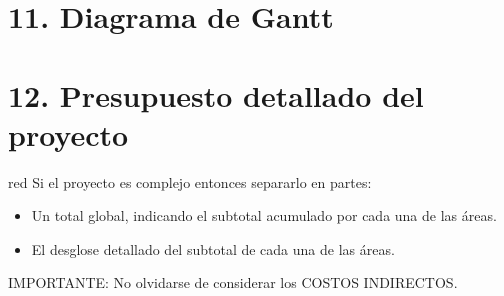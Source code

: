 \documentclass[11pt, %
codirector, %
]{charter}
\begin{document}
\section{11. Diagrama de Gantt}
\label{sec:gantt}





\section{12. Presupuesto detallado del proyecto}
\label{sec:presupuesto}

\begin{consigna}{red}
Si el proyecto es complejo entonces separarlo en partes:
\begin{itemize}
	\item Un total global, indicando el subtotal acumulado por cada una de las áreas.
	\item El desglose detallado del subtotal de cada una de las áreas.
\end{itemize}

IMPORTANTE: No olvidarse de considerar los COSTOS INDIRECTOS.

\end{consigna}
\end{document}
